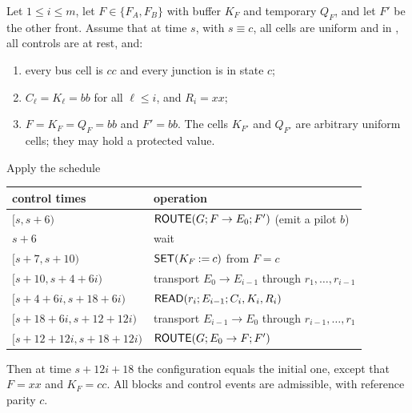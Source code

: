 \begin{lemma}\label{lem:fetch}
Let $1\le i\le m$, let $F\in\{F_A,F_B\}$ with buffer $K_F$ and temporary $Q_F$, and let $F'$ be the
other front. Assume that at time $s$, with $s\equiv c$, all cells are uniform and in \HOLD, all
controls are at rest, and:
\begin{enumerate}[label=(\alph*)]
\item every bus cell is $cc$ and every junction is in state $c$;
\item $C_\ell=K_\ell=bb$ for all $\ell\le i$, and $R_i=xx$;
\item $F=K_F=Q_F=bb$ and $F'=bb$. The cells $K_{F'}$ and $Q_{F'}$ are arbitrary uniform cells; they
  may hold a protected value.
\end{enumerate}
Apply the schedule
\begin{center}\small
\begin{tabular}{ll}\toprule
control times & operation\\\midrule
$[s,s+6)$ & $\textsf{ROUTE}(G;F\to E_0;F')$ (emit a pilot $b$)\\
$s+6$ & wait\\
$[s+7,s+10)$ & $\textsf{SET}(K_F\mathbin{:=}c)$ from $F=c$\\
$[s+10,s+4+6i)$ & transport $E_0\to E_{i-1}$ through $r_1,\dots,r_{i-1}$\\
$[s+4+6i,s+18+6i)$ & $\textsf{READ}(r_i;E_{i-1};C_i,K_i,R_i)$\\
$[s+18+6i,s+12+12i)$ & transport $E_{i-1}\to E_0$ through $r_{i-1},\dots,r_1$\\
$[s+12+12i,s+18+12i)$ & $\textsf{ROUTE}(G;E_0\to F;F')$\\\bottomrule
\end{tabular}
\end{center}
Then at time $s+12i+18$ the configuration equals the initial one, except that $F=xx$ and
$K_F=cc$. All blocks and control events are admissible, with reference parity $c$.
\end{lemma}

